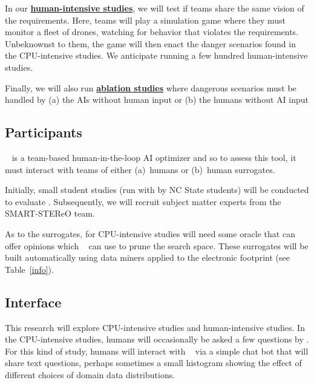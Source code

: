 In our
\underline{\bf human-intensive studies}, we will test if teams share the same vision of the requirements.  Here, teams will  
play a simulation game where they must monitor a fleet of drones, watching for behavior that violates the requirements.
Unbeknownst to them, the game will then enact the danger scenarios found
in the CPU-intensive studies.    We anticipate running a few hundred human-intensive studies.

Finally, we will  also run   \underline{\bf ablation studies} where   dangerous scenarios must be handled by (a) the AIs without human input or (b) the humans without AI input



\subsection{Participants}
\noindent
 \IT~  is a team-based human-in-the-loop AI optimizer and so to assess this tool, it must interact with teams of either (a)~humans or 
 (b)~human surrogates. 

Initially, small student studies  (run with by NC State students) will be conducted to evaluate  \IT. 
Subsequently, we will recruit subject matter experts from the SMART-STEReO team.

As to the surrogates, for CPU-intensive studies will need some oracle that can offer opinions which \IT~ can use to prune the search space. These surrogates will be built automatically using data miners applied to the   electronic footprint (see Table~\ref{info}).






\subsection{Interface}\label{interfaces}
\noindent

This research will explore  CPU-intensive studies and human-intensive studies.
In the CPU-intensive studies, humans will occasionally be asked a few questions
by \IT. For this kind of study, humans will interact with \IT~ via a simple chat bot that will share text questions, perhaps sometimes a small histogram showing the effect of different choices of domain data distributions.

